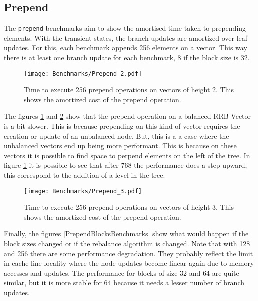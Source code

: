\FloatBarrier

\subsection{Prepend}
The \texttt{prepend} benchmarks aim to show the amortised time taken to prepending elements. With the transient states, the branch updates are amortized over leaf updates. For this, each benchmark appends 256 elements on a vector. This way there is at least one branch update for each benchmark, 8 if the block size is 32.


\begin{figure}[h!]
  \centering
  \texttt{[image: Benchmarks/Prepend\_2.pdf]}
  \caption{Time to execute 256 prepend operations on vectors of height 2. This shows the amortized cost of the prepend operation.}
  \label{Prepend2Benchmarks}
\end{figure}

The figures \ref{Prepend2Benchmarks} and \ref{Prepend3Benchmarks} show that the prepend operation on a balanced RRB-Vector is a bit slower. This is because prepending on this kind of vector requires the creation or update of an unbalanced node. But, this is a a case where the unbalanced vectors end up being more performant. This is because on these vectors it is possible to find space to perpend elements on the left of the tree. In figure \ref{Prepend2Benchmarks} it is possible to see that after 768 the performance does a step upward, this correspond to the addition of a level in the tree.

\begin{figure}[h!]
  \centering
  \texttt{[image: Benchmarks/Prepend\_3.pdf]}
  \caption{Time to execute 256 prepend operations on vectors of height 3. This shows the amortized cost of the prepend operation.}
  \label{Prepend3Benchmarks}
\end{figure}

\FloatBarrier

Finally, the figures \ref{PrependBlocksBenchmarks} show what would happen if the block sizes changed or if the rebalance algorithm is changed. Note that with 128 and 256 there are some performance degradation. They probably reflect the limit in cache-line locality where the node updates become linear again due to memory accesses and updates. The performance for blocks of size 32 and 64 are quite similar, but it is more stable for 64 because it needs a lesser number of branch updates.

